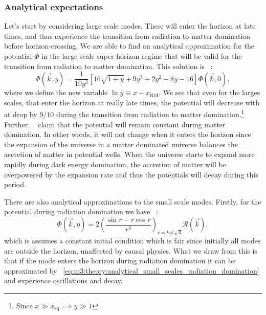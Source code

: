 \subsubsection{Analytical expectations}\label{sec:m3:theory:analytical_expectations}
    Let's start by considering large scale modes. These will enter the horizon at late times, and thus experience the transition from radiation to matter domination before horizon-crossing. We are able to find an analytical approximation for the potential $\Phi$ in the large scale super-horizon regime that will be valid for the transition from radiation to matter domination. This solution is ~\cite[Eq. 8.31]{dodelson2020modern}:
    \begin{equation}\label{eq:m3:theory:analytical_large_scale_super_horizon}
        \Phi(\vec{k},y) = \frac{1}{10y^3}\left[16\sqrt{1+y} + 9y^3 + 2y^2-8y-16\right]\Phi(\vec{k},0),
    \end{equation}
    where we define the new variable $\ln y \equiv x-x_\mathrm{RM}$. We see that even for the larges scales, that enter the horizon at really late times, the potential will decrease with at drop by $9/10$ during the transition from radiation to matter domination.\footnote{Since $x\gg x_\mathrm{eq} \implies y\gg 1$} Further, ~\cite{dodelson2020modern} claim that the potential will remain constant during matter domination. In other words, it will not change when it enters the horizon since the expansion of the universe in a matter dominated universe balances the accretion of matter in potential wells. When the universe starts to expand more rapidly during dark energy domination, the accretion of matter will be overpowered by the expansion rate and thus the potentials will decay during this period. 

    There are also analytical approximations to the small scale modes. Firstly, for the potential during radiation domination we have ~\cite[Eq. 8.46]{dodelson2020modern}:
    \begin{equation}\label{eq:m3:theory:analytical_small_scales_radiation_domination}
        \Phi(\vec{k},\eta) = 2\left(\frac{\sin{r} - r\cos{r}}{r^3}\right)_{r=k\eta/\sqrt{3}}\mathcal{R}(\vec{k}),
    \end{equation}
    which is assumes a constant initial condition which is fair since initially all modes are outside the horizon, unaffected by causal physics. What we draw from this is that if the mode enters the horizon during radiation domination it can be approximated by ~\cref{eq:m3:theory:analytical_small_scales_radiation_domination} and experience oscillations and decay. 

